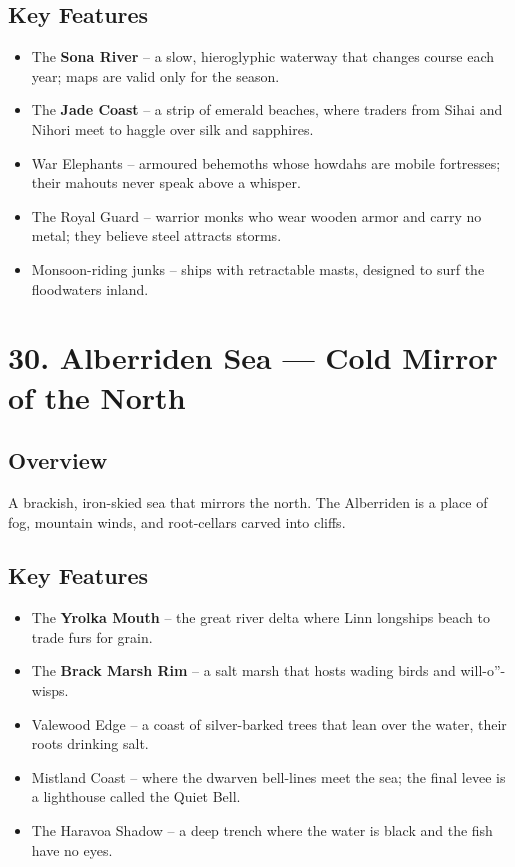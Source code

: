 \documentclass[11pt]{article}
\begin{document}
\subsection*{Key Features}
\begin{itemize}[leftmargin=*]
    \item The \textbf{Sona River} -- a slow, hieroglyphic waterway that changes course each year; maps are valid only for the season.
    \item The \textbf{Jade Coast} -- a strip of emerald beaches, where traders from Sihai and Nihori meet to haggle over silk and sapphires.
    \item War Elephants -- armoured behemoths whose howdahs are mobile fortresses; their mahouts never speak above a whisper.
    \item The Royal Guard -- warrior monks who wear wooden armor and carry no metal; they believe steel attracts storms.
    \item Monsoon-riding junks -- ships with retractable masts, designed to surf the floodwaters inland.
\end{itemize}

\section*{30. Alberriden Sea --- Cold Mirror of the North}

\subsection*{Overview}
A brackish, iron-skied sea that mirrors the north. The Alberriden is a place of fog, mountain winds, and root-cellars carved into cliffs.

\subsection*{Key Features}
\begin{itemize}[leftmargin=*]
    \item The \textbf{Yrolka Mouth} -- the great river delta where Linn longships beach to trade furs for grain.
    \item The \textbf{Brack Marsh Rim} -- a salt marsh that hosts wading birds and will-o''-wisps.
    \item Valewood Edge -- a coast of silver-barked trees that lean over the water, their roots drinking salt.
    \item Mistland Coast -- where the dwarven bell-lines meet the sea; the final levee is a lighthouse called the Quiet Bell.
    \item The Haravoa Shadow -- a deep trench where the water is black and the fish have no eyes.
\end{itemize}
\end{document}
